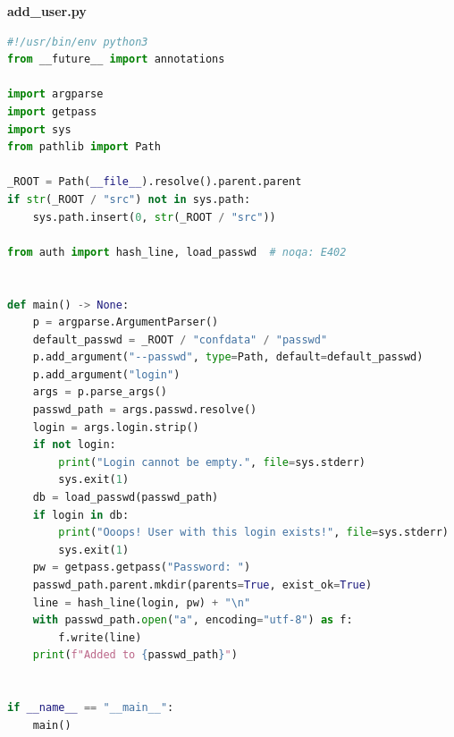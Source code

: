 \documentclass[areasetadvanced]{scrartcl}
\begin{document}
\textbf{add\_user.py}
\begin{lstlisting}[language=Python]
#!/usr/bin/env python3
from __future__ import annotations

import argparse
import getpass
import sys
from pathlib import Path

_ROOT = Path(__file__).resolve().parent.parent
if str(_ROOT / "src") not in sys.path:
    sys.path.insert(0, str(_ROOT / "src"))

from auth import hash_line, load_passwd  # noqa: E402


def main() -> None:
    p = argparse.ArgumentParser()
    default_passwd = _ROOT / "confdata" / "passwd"
    p.add_argument("--passwd", type=Path, default=default_passwd)
    p.add_argument("login")
    args = p.parse_args()
    passwd_path = args.passwd.resolve()
    login = args.login.strip()
    if not login:
        print("Login cannot be empty.", file=sys.stderr)
        sys.exit(1)
    db = load_passwd(passwd_path)
    if login in db:
        print("Ooops! User with this login exists!", file=sys.stderr)
        sys.exit(1)
    pw = getpass.getpass("Password: ")
    passwd_path.parent.mkdir(parents=True, exist_ok=True)
    line = hash_line(login, pw) + "\n"
    with passwd_path.open("a", encoding="utf-8") as f:
        f.write(line)
    print(f"Added to {passwd_path}")


if __name__ == "__main__":
    main()
\end{lstlisting}
\end{document}
